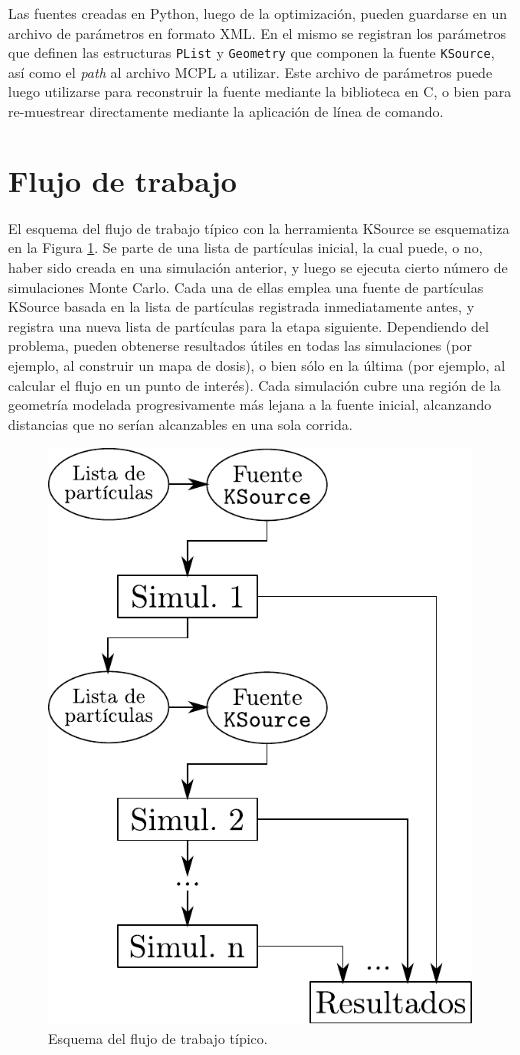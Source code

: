 Las fuentes creadas en Python, luego de la optimización, pueden guardarse en un archivo de parámetros en formato XML. En el mismo se registran los parámetros que definen las estructuras \verb|PList| y \verb|Geometry| que componen la fuente \verb|KSource|, así como el \emph{path} al archivo MCPL a utilizar. Este archivo de parámetros puede luego utilizarse para reconstruir la fuente mediante la biblioteca en C, o bien para re-muestrear directamente mediante la aplicación de línea de comando.


\section{Flujo de trabajo}

El esquema del flujo de trabajo típico con la herramienta KSource se esquematiza en la Figura \ref{fig:flujo}. Se parte de una lista de partículas inicial, la cual puede, o no, haber sido creada en una simulación anterior, y luego se ejecuta cierto número de simulaciones Monte Carlo. Cada una de ellas emplea una fuente de partículas KSource basada en la lista de partículas registrada inmediatamente antes, y registra una nueva lista de partículas para la etapa siguiente. Dependiendo del problema, pueden obtenerse resultados útiles en todas las simulaciones (por ejemplo, al construir un mapa de dosis), o bien sólo en la última (por ejemplo, al calcular el flujo en un punto de interés). Cada simulación cubre una región de la geometría modelada progresivamente más lejana a la fuente inicial, alcanzando distancias que no serían alcanzables en una sola corrida.

\begin{figure}[htbp!]
	\centering
	\includegraphics[width=.7\textwidth]{figs/flujo_trabajo.pdf}
	\caption{Esquema del flujo de trabajo típico.}
	\label{fig:flujo}
\end{figure}

